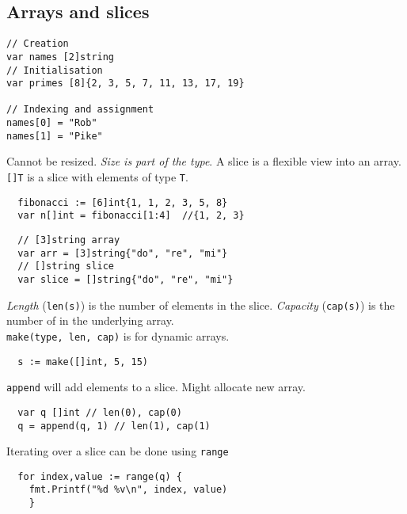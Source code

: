 \subsection{Arrays and slices}

\begin{lstlisting}
// Creation
var names [2]string
// Initialisation
var primes [8]{2, 3, 5, 7, 11, 13, 17, 19}

// Indexing and assignment
names[0] = "Rob"
names[1] = "Pike"
\end{lstlisting}

Cannot be resized. \emph{Size is part of the type}. A slice is a flexible view into an array.
\texttt{[]T} is a slice with elements of type \texttt{T}.

\begin{lstlisting}
  fibonacci := [6]int{1, 1, 2, 3, 5, 8}
  var n[]int = fibonacci[1:4]  //{1, 2, 3}
\end{lstlisting}

\begin{lstlisting}
  // [3]string array
  var arr = [3]string{"do", "re", "mi"}
  // []string slice
  var slice = []string{"do", "re", "mi"}
\end{lstlisting}

\emph{Length} (\texttt{len(s)}) is the number of elements in the slice.
\emph{Capacity} (\texttt{cap(s)}) is the number of in the underlying array.
\\
\texttt{make(type, len, cap)} is for dynamic arrays.
\begin{lstlisting}
  s := make([]int, 5, 15)
\end{lstlisting}
\texttt{append} will add elements to a slice. Might allocate new array.
\begin{lstlisting}
  var q []int // len(0), cap(0)
  q = append(q, 1) // len(1), cap(1)
\end{lstlisting}

Iterating over a slice can be done using \texttt{range}
\begin{lstlisting}
  for index,value := range(q) {
    fmt.Printf("%d %v\n", index, value)
    }
\end{lstlisting}
